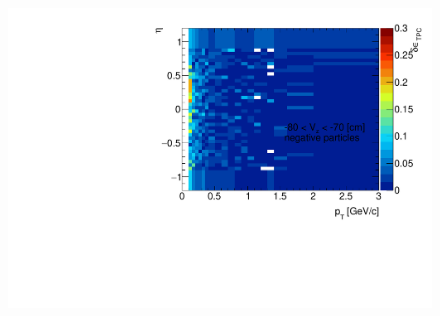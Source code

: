 \begin{figure}[H]
{		\includegraphics[width=\linewidth,page=15]{graphics/systematicsEfficiency/deadMaterial/secondaries_Unbinned_Charged_SD.pdf}\\
	}%
\end{figure}

